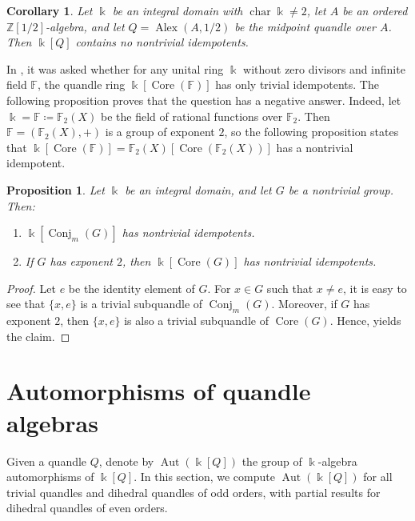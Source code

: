 \documentclass[12 pt]{amsart}
\newtheorem{corollary}[theorem]{Corollary}
\newtheorem{proposition}[theorem]{Proposition}
\theoremstyle{definition}
\theoremstyle{remark}
\numberwithin{equation}{section}
\newcommand{\Alex}{\operatorname{Alex}}
\newcommand{\Aut}{\operatorname{Aut}}
\newcommand{\Core}{\operatorname{Core}}
\newcommand{\Z}{\mathbb{Z}}
\renewcommand{\k}{\Bbbk}
\newcommand{\F}{\mathbb F}
\newcommand{\chara}{\operatorname{char}}
\begin{document}
\begin{corollary}
    Let $\k$ be an integral domain with $\chara\k\neq 2$, let $A$ be an ordered $\Z[1/2]$-algebra, and let $Q=\Alex(A,1/2)$ be the midpoint quandle over $A$. Then $\k[Q]$ contains no nontrivial idempotents.
\end{corollary}

In \cite[Question 3.1]{BE}, it was asked whether for any unital ring $\Bbbk$ without zero divisors and infinite field $\mathbb F$, the quandle ring $\Bbbk[\operatorname{Core}(\mathbb F)]$ has only trivial idempotents. The following proposition proves that the question has a negative answer. Indeed, let $\k=\F\coloneq\mathbb{F}_2(X)$ be the field of rational functions over $\mathbb{F}_2$. Then $\F=(\mathbb{F}_2(X), +)$ is a group of exponent $2$, so the following proposition states that $\k[\Core(\F)]=\mathbb{F}_2(X)[\operatorname{Core}(\mathbb{F}_2(X))]$ has a nontrivial idempotent.
\begin{proposition}
   Let $\Bbbk$ be an integral domain, and let $G$ be a nontrivial group. Then:
   \begin{enumerate}
       \item $\Bbbk[\operatorname{Conj}_{m}(G)]$ has nontrivial idempotents.
        \item If $G$ has exponent $2$,  then $\Bbbk[\operatorname{Core}(G)]$ has nontrivial idempotents. 
   \end{enumerate}
   \end{proposition}
\begin{proof}
Let $e$ be the identity element of $G$. For $x \in G$ such that $x \neq e$, it is easy to see that $\{x, e\}$ is a trivial subquandle of $\operatorname{Conj}_m(G)$. Moreover, if $G$ has exponent $2$, then $\{x, e\}$ is also a trivial subquandle of $\operatorname{Core}(G)$. Hence, \cite[Prop.\ 3.3]{MBMD} yields the claim.
\end{proof}





\section{Automorphisms of quandle algebras}\label{sec-auto}

Given a quandle $Q$, denote by $\Aut (\k[Q])$ the group of $\k$-algebra automorphisms of $\k[Q]$. 
In this section, we compute $\Aut (\k[Q])$ for all trivial quandles and dihedral quandles of odd orders, with partial results for dihedral quandles of even orders. 
\end{document}
